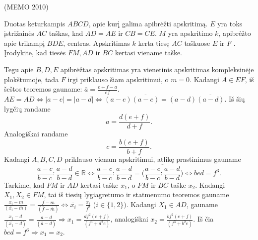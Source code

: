 \documentclass[11pt,a4paper,twoside]{book}
\begin{document}
\begin{pavnr} 
(MEMO 2010)

Duotas keturkampis $ABCD$, apie kurį galima apibrėžti apskritimą. $E$ yra toks įstrižainės $AC$
taškas, kad $AD = AE$ ir $CB = CE$. $M$ yra apskritimo $k$, apibrėžto apie trikampį $BDE$,
centras. Apskritimas $k$ kerta tiesę $AC$ taškuose $E$ ir $F$ . Įrodykite, kad tiesės $FM, AD$ ir $BC$ kertasi viename taške.
\end{pavnr}
\begin{sprendimas}
Tegu apie $B, D, E$ apibrėžtas apskritimas yra vienetinis apskritimas kompleksinėje plokštumoje, tada $F$ irgi priklauso šiam apskritimui, o $m=0$. Kadangi $A\in EF$, iš šeštos teoremos gauname: $\overline{a}=\frac{e+f-a}{ef}$. $AE = AD \Leftrightarrow |a-e|=|a-d| \Leftrightarrow (a-e)\overline{(a-e)}=(a-d)\overline{(a-d)}$. Iš šių lygčių randame
$$a=\frac{d(e+f)}{d+f}.$$
Analogiškai randame
$$c=\frac{b(e+f)}{b+f}.$$
Kadangi $A, B, C, D$ priklauso vienam apskritimui, atlikę prastinimus gauname
$$\frac{a-c}{b-c}:\frac{a-d}{b-d}\in \mathbb{R} \Leftrightarrow \frac{a-c}{b-c}:\frac{a-d}{b-d}= \overline{\bigg(\frac{a-c}{b-c}:\frac{a-d}{b-d}\bigg)} \Leftrightarrow bed=f^3.$$
Tarkime, kad $FM$ ir $AD$ kertasi taške $x_1$, o $FM$ ir $BC$ taške $x_2$. Kadangi $X_1, X_2 \in FM$, tai iš tiesių lygiagretumo ir statmenumo teoremos gauname $\frac{x_i-m}{(\overline{x_i}-\overline{m})}=\frac{f-m}{(\overline{f}-\overline{m})} \Leftrightarrow          \overline{x_i}=\frac{x_i}{f^2}$ ($i \in \{1, 2\})$.
Kadangi $X_1 \in AD$, gauname $\frac{x_1-d}{(\overline{x_1}-\overline{d})}=\frac{a-d}{(\overline{a}-\overline{d})} \Rightarrow x_1=\frac{df^2(e+f)}{(f^3+d^2e)}$,
analogiškai $x_2=\frac{bf^2(e+f)}{(f^3+b^2e)}$.
Iš čia $bed=f^3 \Rightarrow x_1=x_2.$
\end{sprendimas}
\end{document}
